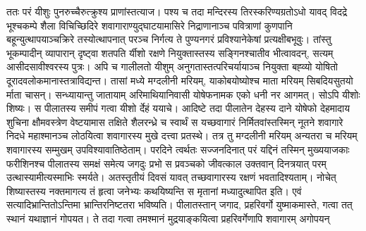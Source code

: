 \vakya ततः परं यीशुः पुनरुच्चैरुत्क्रुश्य प्राणांस्तत्याज।
\vakya पश्य च तदा मन्दिरस्य तिरस्करिण्यग्रतोऽधो यावद् विदद्रे भूश्चकम्पे शैला विचिच्छिदिरे
\vakya शवागाराण्युद्घाटयामासिरे निद्राणानाञ्च पवित्राणां कुणपानि बहून्युत्थापयाञ्चक्रिरे
\vakya तस्योत्थापनात् परञ्च निर्गत्य ते पुण्यनगरं प्रविश्यानेकेषां प्रत्यक्षीबभूवुः।
\vakya तांस्तु भूकम्पादीन् व्यापारान् दृष्ट्वा शतपति र्यीशो रक्षणे नियुक्तास्तस्य सङ्गिनश्चातीव भीत्वावदन्, सत्यम् आसीदसावीश्वरस्य पुत्रः।
\vakya अपि च गालीलतो यीशुम् अनुगतास्तत्परिचर्यायाञ्च नियुक्ता बह्व्यो योषितो दूरादवलोकमानास्तत्राविद्यन्त।
\vakya तासां मध्ये मग्दलीनी मरियम्, याकोबयोष्योश्च माता मरियम् सिबदियसुतयो र्माता चासन्।
\vakya सन्ध्यायान्तु जातायाम् अरिमाथियानिवासी योषेफनामक एको धनी नर आगमत्। सोऽपि यीशोः शिष्यः।
\vakya स पीलातस्य समीपं गत्वा यीशो र्देहं ययाचे। आदिष्टे तदा पीलातेन देहस्य दाने
\vakya योषेफो देहमादाय शुचिना क्षौमवस्त्रेण वेष्टयामास
\vakya तक्षिते शैलरन्ध्रे च स्वार्थं स यच्छवागारं निर्मितवांस्तस्मिन् नूतने शवागारे निदधे महाश्मानञ्च लोठयित्वा शवागारस्य मुखे दत्त्वा प्रतस्थे।
\vakya तत्र तु मग्दलीनी मरियम् अन्यतरा च मरियम् शवागारस्य सम्मुखम् उपविश्यावातिष्ठेताम्।
\vakya परदिने त्वर्थतः सज्जनदिनात् परं यद्दिनं तस्मिन् मुख्ययाजकाः फरीशिनश्च पीलातस्य समक्षं समेत्य जगदुः
\vakya प्रभो स प्रवञ्चको जीवत्काल उक्तवान् दिनत्रयात् परम् उत्थास्यामीत्यस्माभिः स्मर्यते।
\vakya अतस्तृतीयं दिवसं यावत् तच्छवागारस्य रक्षणं भवतादिश्यताम्। नोचेत् शिष्यास्तस्य नक्तमागत्य तं हृत्वा जनेभ्यः कथयिष्यन्ति स मृतानां मध्यादुत्थापित इति। एवं सत्यादिभ्रान्तितोऽन्तिमा भ्रान्तिरनिष्टतरा भविष्यति।
\vakya पीलातस्तान् जगाद, प्रहरिवर्गो युष्माकमास्ते, गत्वा तत् स्थानं यथाज्ञानं गोपयत। ते तदा गत्वा तमश्मानं मुद्रयाङ्कयित्वा प्रहरिवर्गेणापि शवागारम् अगोपयन्\eoc